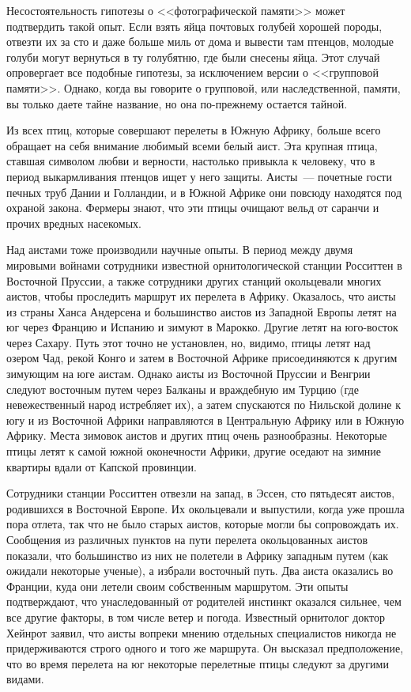 \documentclass[12pt,a4paper,twoside,openany,svgnames]{memoir}
\begin{document}
Несостоятельность гипотезы о <<фотографической памяти>> может подтвердить такой опыт. Если взять яйца почтовых голубей хорошей породы, отвезти их за сто и даже больше миль от дома и вывести там птенцов, молодые голуби могут вернуться в ту голубятню, где были снесены яйца. Этот случай опровергает все подобные гипотезы, за исключением версии о <<групповой памяти>>. Однако, когда вы говорите о групповой, или наследственной, памяти, вы только даете тайне название, но она по-прежнему остается тайной.

Из всех птиц, которые совершают перелеты в Южную Африку, больше всего обращает на себя внимание любимый всеми белый аист. Эта крупная птица, ставшая символом любви и верности, настолько привыкла к человеку, что в период выкармливания птенцов ищет у него защиты. Аисты~--- почетные гости печных труб Дании и Голландии, и в Южной Африке они повсюду находятся под охраной закона. Фермеры знают, что эти птицы очищают вельд от саранчи и прочих вредных насекомых.

Над аистами тоже производили научные опыты. В период между двумя мировыми войнами сотрудники известной орнитологической станции Росситтен в Восточной Пруссии, а также сотрудники других станций окольцевали многих аистов, чтобы проследить маршрут их перелета в Африку. Оказалось, что аисты из страны Ханса Андерсена и большинство аистов из Западной Европы летят на юг через Францию и Испанию и зимуют в Марокко. Другие летят на юго-восток через Сахару. Путь этот точно не установлен, но, видимо, птицы летят над озером Чад, рекой Конго и затем в Восточной Африке присоединяются к другим зимующим на юге аистам. Однако аисты из Восточной Пруссии и Венгрии следуют восточным путем через Балканы и враждебную им Турцию (где невежественный народ истребляет их), а затем спускаются по Нильской долине к югу и из Восточной Африки направляются в Центральную Африку или в Южную Африку. Места зимовок аистов и других птиц очень разнообразны. Некоторые птицы летят к самой южной оконечности Африки, другие оседают на зимние квартиры вдали от Капской провинции.

Сотрудники станции Росситтен отвезли на запад, в Эссен, сто пятьдесят аистов, родившихся в Восточной Европе. Их окольцевали и выпустили, когда уже прошла пора отлета, так что не было старых аистов, которые могли бы сопровождать их. Сообщения из различных пунктов на пути перелета окольцованных аистов показали, что большинство из них не полетели в Африку западным путем (как ожидали некоторые ученые), а избрали восточный путь. Два аиста оказались во Франции, куда они летели своим собственным маршрутом. Эти опыты подтверждают, что унаследованный от родителей инстинкт оказался сильнее, чем все другие факторы, в том числе ветер и погода. Известный орнитолог доктор Хейнрот заявил, что аисты вопреки мнению отдельных специалистов никогда не придерживаются строго одного и того же маршрута. Он высказал предположение, что во время перелета на юг некоторые перелетные птицы следуют за другими видами.
\end{document}
